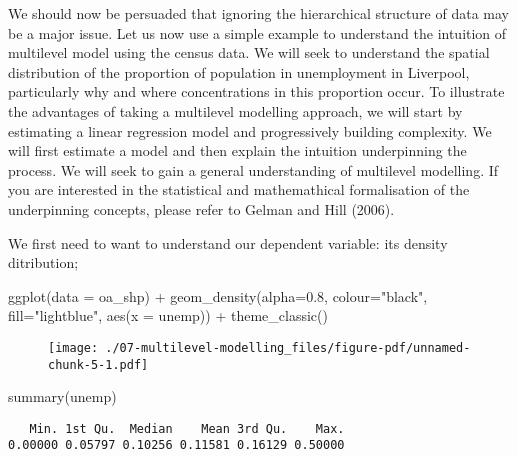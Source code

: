 \documentclass[
  letterpaper,
  krantz2]{style/krantz}
\newenvironment{Shaded}{\begin{snugshade}}{\end{snugshade}}
\newcommand{\AttributeTok}[1]{\textcolor[rgb]{0.40,0.45,0.13}{#1}}
\newcommand{\FloatTok}[1]{\textcolor[rgb]{0.68,0.00,0.00}{#1}}
\newcommand{\FunctionTok}[1]{\textcolor[rgb]{0.28,0.35,0.67}{#1}}
\newcommand{\NormalTok}[1]{\textcolor[rgb]{0.00,0.23,0.31}{#1}}
\newcommand{\SpecialCharTok}[1]{\textcolor[rgb]{0.37,0.37,0.37}{#1}}
\newcommand{\StringTok}[1]{\textcolor[rgb]{0.13,0.47,0.30}{#1}}
\begin{document}
We should now be persuaded that ignoring the hierarchical structure of
data may be a major issue. Let us now use a simple example to understand
the intuition of multilevel model using the census data. We will seek to
understand the spatial distribution of the proportion of population in
unemployment in Liverpool, particularly why and where concentrations in
this proportion occur. To illustrate the advantages of taking a
multilevel modelling approach, we will start by estimating a linear
regression model and progressively building complexity. We will first
estimate a model and then explain the intuition underpinning the
process. We will seek to gain a general understanding of multilevel
modelling. If you are interested in the statistical and mathemathical
formalisation of the underpinning concepts, please refer to Gelman and
Hill (2006).

We first need to want to understand our dependent variable: its density
ditribution;

\begin{Shaded}
\begin{Highlighting}[]
\FunctionTok{ggplot}\NormalTok{(}\AttributeTok{data =}\NormalTok{ oa\_shp) }\SpecialCharTok{+}
\FunctionTok{geom\_density}\NormalTok{(}\AttributeTok{alpha=}\FloatTok{0.8}\NormalTok{, }\AttributeTok{colour=}\StringTok{"black"}\NormalTok{, }\AttributeTok{fill=}\StringTok{"lightblue"}\NormalTok{, }\FunctionTok{aes}\NormalTok{(}\AttributeTok{x =}\NormalTok{ unemp)) }\SpecialCharTok{+}
   \FunctionTok{theme\_classic}\NormalTok{()}
\end{Highlighting}
\end{Shaded}

\begin{figure}[H]

{\centering \texttt{[image: ./07-multilevel-modelling\_files/figure-pdf/unnamed-chunk-5-1.pdf]}

}

\end{figure}

\begin{Shaded}
\begin{Highlighting}[]
\FunctionTok{summary}\NormalTok{(unemp)}
\end{Highlighting}
\end{Shaded}

\begin{verbatim}
   Min. 1st Qu.  Median    Mean 3rd Qu.    Max. 
0.00000 0.05797 0.10256 0.11581 0.16129 0.50000 
\end{verbatim}
\end{document}
